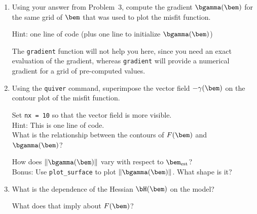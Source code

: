 \documentclass[11pt,titlepage,fleqn]{article}
\begin{document}
\begin{enumerate}

\pagebreak

\item Using your answer from Problem~3, compute the gradient $\bgamma(\bem)$ for the same grid of $\bem$ that was used to plot the misfit function.

Hint: one line of code (plus one line to initialize $\bgamma(\bem)$)

The \verb+gradient+ function will not help you here, since you need an exact evaluation of the gradient, whereas \verb+gradient+ will provide a numerical gradient for a grid of pre-computed values.

\vertgap

\item Using the \verb+quiver+ command, superimpose the vector field $-\gamma(\bem)$ on the contour plot of the misfit function.

Set \verb+nx = 10+ so that the vector field is more visible. \\
Hint: This is one line of code. \\
What is the relationship between the contours of $F(\bem)$ and $\bgamma(\bem)$?

\vertgap

How does $\|\bgamma(\bem)\|$ vary with respect to $\bem_{\rm est}$? \\
Bonus: Use \verb+plot_surface+ to plot $\|\bgamma(\bem)\|$. What shape is it?

\vertgap

\item What is the dependence of the Hessian $\bH(\bem)$ on the model? \\

\vertgap

What does that imply about $F(\bem)$?


\end{enumerate}

\end{document}
